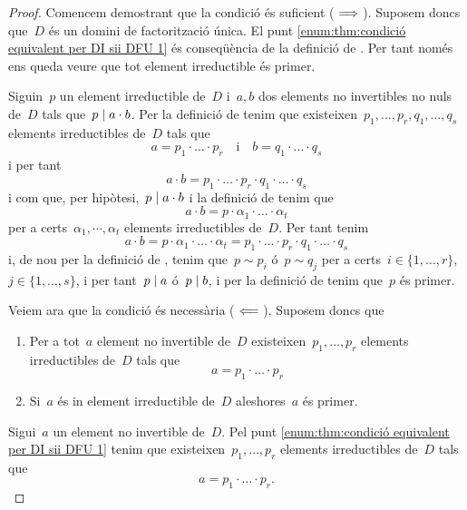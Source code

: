 \documentclass[../../main.tex]{subfiles}
\begin{document}
    \begin{proof}
        Comencem demostrant que la condició és suficient (\(\implies\)).
        Suposem doncs que~\(D\) és un domini de factorització única.
        El punt \eqref{enum:thm:condició equivalent per DI sii DFU 1} és conseqüència de la definició de .
        Per tant només ens queda veure que tot element irreductible és primer.

        Siguin~\(p\) un element irreductible de~\(D\) i~\(a,b\) dos elements no invertibles no nuls de~\(D\) tals que~\(p\mathrel{|} a\cdot b\).
        Per la definició de  tenim que existeixen~\(p_{1},\dots,p_{r},q_{1},\dots,q_{s}\) elements irreductibles de~\(D\) tals que
        \[
            a=p_{1}\cdot\ldots\cdot p_{r}\quad\text{i}\quad b=q_{1}\cdot\ldots\cdot q_{s}
        \]
        i per tant
        \[
            a\cdot b=p_{1}\cdot\ldots\cdot p_{r}\cdot q_{1}\cdot\ldots\cdot q_{s}
        \]
        i com que, per hipòtesi,~\(p\mathrel{|} a\cdot b\) i la definició de  tenim que
        \[
            a\cdot b=p\cdot\alpha_{1}\cdot\ldots\cdot\alpha_{t}
        \]
        per a certs~\(\alpha_{1},\cdots,\alpha_{t}\) elements irreductibles de~\(D\).
        Per tant tenim
        \[
            a\cdot b=p\cdot\alpha_{1}\cdot\ldots\cdot\alpha_{t}=p_{1}\cdot\ldots\cdot p_{r}\cdot q_{1}\cdot\ldots\cdot q_{s}
        \]
        i, de nou per la definició de , tenim que~\(p\sim p_{i}\) ó~\(p\sim q_{j}\) per a certs~\(i\in\{1,\dots,r\}\),~\(j\in\{1,\dots,s\}\), i per tant~\(p\mathrel{|} a\) ó~\(p\mathrel{|} b\), i per la definició de  tenim que~\(p\) és primer.

        Veiem ara que la condició és necessària (\(\impliedby\)).
        Suposem doncs que
        \begin{enumerate}
            \item Per a tot~\(a\) element no invertible de~\(D\) existeixen~\(p_{1},\dots,p_{r}\) elements irreductibles de~\(D\) tals que
            \[
                a=p_{1}\cdot\ldots\cdot p_{r}
            \]
            \item Si~\(a\) és in element irreductible de~\(D\) aleshores~\(a\) és primer.
        \end{enumerate}
        Sigui~\(a\) un element no invertible de~\(D\).
        Pel punt \eqref{enum:thm:condició equivalent per DI sii DFU 1} tenim que existeixen~\(p_{1},\dots,p_{r}\) elements irreductibles de~\(D\) tals que
        \[
            a=p_{1}\cdot\ldots\cdot p_{r}.
        \]


\end{proof}
\end{document}

